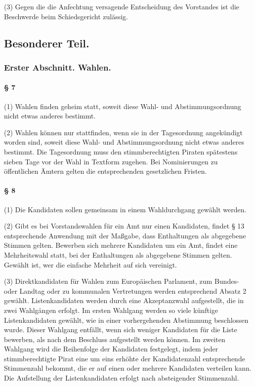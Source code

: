 (3) Gegen die die Anfechtung versagende Entscheidung des Vorstandes ist
die Beschwerde beim Schiedsgericht zulässig.

\subsection{Besonderer Teil.}

\subsubsection{Erster Abschnitt. Wahlen.}

\paragraph{§ 7}

(1) Wahlen finden geheim statt, soweit diese Wahl- und
Abstimmungsordnung nicht etwas anderes bestimmt.

(2) Wahlen können nur stattfinden, wenn sie in der Tagesordnung
angekündigt worden sind, soweit diese Wahl- und Abstimmungsordnung nicht
etwas anderes bestimmt. Die Tagesordnung muss den stimmberechtigten
Piraten spätestens sieben Tage vor der Wahl in Textform zugehen. Bei
Nominierungen zu öffentlichen Ämtern gelten die entsprechenden
gesetzlichen Fristen.

\paragraph{§ 8}

(1) Die Kandidaten sollen gemeinsam in einem Wahldurchgang gewählt
werden.

(2) Gibt es bei Vorstandswahlen für ein Amt nur einen Kandidaten, findet
§ 13 entsprechende Anwendung mit der Maßgabe, dass Enthaltungen als
abgegebene Stimmen gelten. Bewerben sich mehrere Kandidaten um ein Amt,
findet eine Mehrheitswahl statt, bei der Enthaltungen als abgegebene
Stimmen gelten. Gewählt ist, wer die einfache Mehrheit auf sich
vereinigt.

(3) Direktkandidaten für Wahlen zum Europäischen Parlament, zum Bundes-
oder Landtag oder zu kommunalen Vertretungen werden entsprechend Absatz
2 gewählt. Listenkandidaten werden durch eine Akzeptanzwahl aufgestellt,
die in zwei Wahlgängen erfolgt. Im ersten Wahlgang werden so viele
künftige Listenkandidaten gewählt, wie in einer vorhergehenden
Abstimmung beschlossen wurde. Dieser Wahlgang entfällt, wenn sich
weniger Kandidaten für die Liste bewerben, als nach dem Beschluss
aufgestellt werden können. Im zweiten Wahlgang wird die Reihenfolge der
Kandidaten festgelegt, indem jeder stimmberechtigte Pirat eine um eins
erhöhte der Kandidatenzahl entsprechende Stimmenzahl bekommt, die er auf
einen oder mehrere Kandidaten verteilen kann. Die Aufstellung der
Listenkandidaten erfolgt nach absteigender Stimmenzahl.

